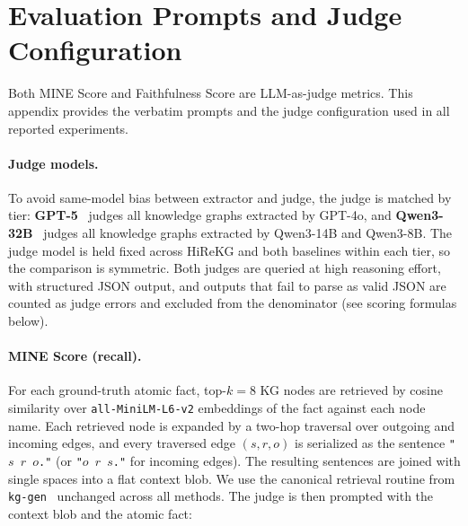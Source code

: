 \documentclass[11pt]{article}
\begin{document}
\section{Evaluation Prompts and Judge Configuration}
\label{app:metrics}

Both MINE Score and Faithfulness Score are LLM-as-judge metrics. This appendix provides the verbatim prompts and the judge configuration used in all reported experiments.

\paragraph{Judge models.} To avoid same-model bias between extractor and judge, the judge is matched by tier: \textbf{GPT-5}~\citep{gpt5} judges all knowledge graphs extracted by GPT-4o, and \textbf{Qwen3-32B}~\citep{qwen3_32b_fp8} judges all knowledge graphs extracted by Qwen3-14B and Qwen3-8B. The judge model is held fixed across HiReKG and both baselines within each tier, so the comparison is symmetric. Both judges are queried at high reasoning effort, with structured JSON output, and outputs that fail to parse as valid JSON are counted as judge errors and excluded from the denominator (see scoring formulas below).

\paragraph{MINE Score (recall).} For each ground-truth atomic fact, top-$k{=}8$ KG nodes are retrieved by cosine similarity over \texttt{all-MiniLM-L6-v2} embeddings of the fact against each node name. Each retrieved node is expanded by a two-hop traversal over outgoing and incoming edges, and every traversed edge $(s, r, o)$ is serialized as the sentence \texttt{"$s$ $r$ $o$."} (or \texttt{"$o$ $r$ $s$."} for incoming edges). The resulting sentences are joined with single spaces into a flat context blob. We use the canonical retrieval routine from \texttt{kg-gen}~\citep{kggen} unchanged across all methods. The judge is then prompted with the context blob and the atomic fact:

\end{document}

